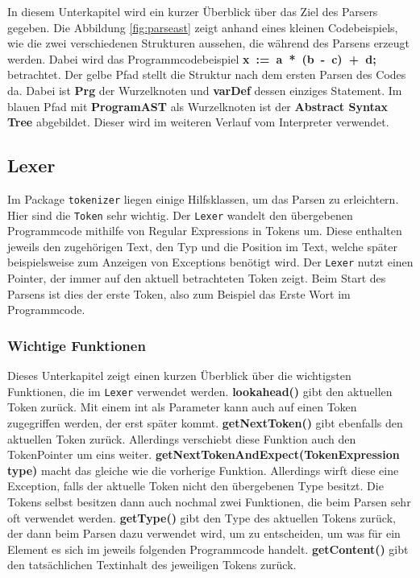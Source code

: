 In diesem Unterkapitel wird ein kurzer Überblick über das Ziel des Parsers gegeben. Die Abbildung \ref{fig:parseast} zeigt anhand eines kleinen Codebeispiels, wie die zwei verschiedenen Strukturen aussehen, die während des Parsens erzeugt werden. Dabei wird das Programmcodebeispiel \mbox{\textbf{x := a * (b - c) + d;}} betrachtet. Der gelbe Pfad stellt die Struktur nach dem ersten Parsen des Codes da. Dabei ist \textbf{Prg} der Wurzelknoten und \textbf{varDef} dessen einziges Statement. Im blauen Pfad mit \textbf{ProgramAST} als Wurzelknoten ist der \textbf{Abstract Syntax Tree} abgebildet. Dieser wird im weiteren Verlauf vom Interpreter verwendet.

\subsection{Lexer}

Im Package \texttt{tokenizer} liegen einige Hilfsklassen, um das Parsen zu erleichtern. 
Hier sind die \texttt{Token} sehr wichtig. 
Der \texttt{Lexer} wandelt den übergebenen Programmcode mithilfe von Regular Expressions in Tokens um. Diese enthalten jeweils den zugehörigen Text, den Typ und die Position im Text, welche später beispielsweise zum Anzeigen von Exceptions benötigt wird. 
Der \texttt{Lexer} nutzt einen Pointer, der immer auf den aktuell betrachteten Token zeigt. Beim Start des Parsens ist dies der erste Token, also zum Beispiel das Erste Wort im Programmcode.

\subsubsection{Wichtige Funktionen}

Dieses Unterkapitel zeigt einen kurzen Überblick über die wichtigsten Funktionen, die im \texttt{Lexer} verwendet werden.
\newline
\textbf{lookahead()} gibt den aktuellen Token zurück. Mit einem int als Parameter kann auch auf einen Token zugegriffen werden, der erst später kommt.
\newline
\textbf{getNextToken()} gibt ebenfalls den aktuellen Token zurück. Allerdings verschiebt diese Funktion auch den TokenPointer um eins weiter.
\newline
\textbf{getNextTokenAndExpect(TokenExpression type)} macht das gleiche wie die vorherige Funktion. Allerdings wirft diese eine Exception, falls der aktuelle Token nicht den übergebenen Type besitzt.
\newline
\newline
Die Tokens selbst besitzen dann auch nochmal zwei Funktionen, die beim Parsen sehr oft verwendet werden.
\newline
\textbf{getType()} gibt den Type des aktuellen Tokens zurück, der dann beim Parsen dazu verwendet wird, um zu entscheiden, um was für ein Element es sich im jeweils folgenden Programmcode handelt. 
\newline
\textbf{getContent()} gibt den tatsächlichen Textinhalt des jeweiligen Tokens zurück.



